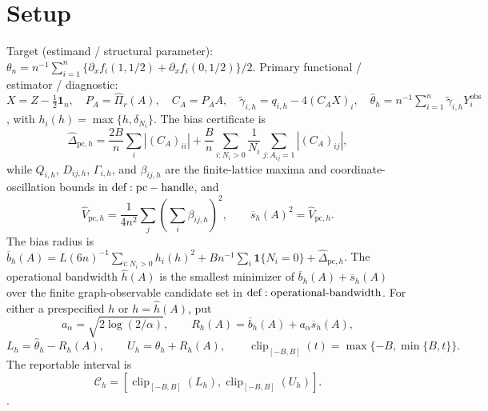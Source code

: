 \documentclass{article}
\begin{document}
\section{Setup}

Target (estimand / structural parameter): \(\theta_n=n^{-1}\sum_{i=1}^n\{\partial_x f_i(1,1/2)+\partial_x f_i(0,1/2)\}/2\).
Primary functional / estimator / diagnostic: \(X=Z-\tfrac12\mathbf1_n,\quad P_A=\widehat\Pi_r(A),\quad C_A=P_AA,\quad \widetilde\gamma_{i,h}=q_{i,h}-4(C_AX)_i,\quad \widehat\theta_h=n^{-1}\sum_{i=1}^n\widetilde\gamma_{i,h}Y_i^{\mathrm{obs}}\), with \(h_i(h)=\max\{h,\delta_{N_i}\}\).  The bias certificate is
\[
 \widehat\Delta_{\mathrm{pc},h}=\frac{2B}{n}\sum_i|(C_A)_{ii}|+\frac{B}{n}\sum_{i:N_i>0}\frac1{N_i}\sum_{j:A_{ij}=1}|(C_A)_{ij}|,
\]
while \(Q_{i,h}\), \(D_{ij,h}\), \(\Gamma_{i,h}\), and \(\beta_{ij,h}\) are the finite-lattice maxima and coordinate-oscillation bounds in \({\rm def:pc-handle}\), and
\[
 \widehat V_{\mathrm{pc},h}=\frac1{4n^2}\sum_j\left(\sum_i\beta_{ij,h}\right)^2,
 \qquad
 \overline s_h(A)^2=\widehat V_{\mathrm{pc},h}.
\]
The bias radius is \(\overline b_h(A)=L(6n)^{-1}\sum_{i:N_i>0}h_i(h)^2+Bn^{-1}\sum_i\mathbf1\{N_i=0\}+\widehat\Delta_{\mathrm{pc},h}\).  The operational bandwidth \(\widehat h(A)\) is the smallest minimizer of \(\overline b_h(A)+\overline s_h(A)\) over the finite graph-observable candidate set in \({\rm def:operational\text{-}bandwidth}\).  For either a prespecified \(h\) or \(h=\widehat h(A)\), put
\[
 a_\alpha=\sqrt{2\log(2/\alpha)},\qquad R_h(A)=\overline b_h(A)+a_\alpha\overline s_h(A),
\]
\[
 L_h=\widehat\theta_h-R_h(A),\qquad U_h=\widehat\theta_h+R_h(A),\qquad \operatorname{clip}_{[-B,B]}(t)=\max\{-B,\min\{B,t\}\}.
\]
The reportable interval is
\[
 \mathcal C_h=[\operatorname{clip}_{[-B,B]}(L_h),\operatorname{clip}_{[-B,B]}(U_h)].
\].
\end{document}
